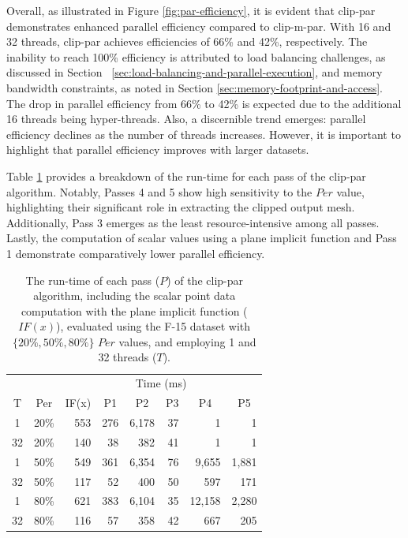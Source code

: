 \documentclass{egpubl}
\begin{document}
Overall, as illustrated in Figure \ref{fig:par-efficiency}, it is evident that clip-par demonstrates enhanced parallel efficiency compared to clip-m-par. With 16 and 32 threads, clip-par achieves efficiencies of 66\% and 42\%, respectively. The inability to reach 100\% efficiency is attributed to load balancing challenges, as discussed in Section ~\ref{sec:load-balancing-and-parallel-execution}, and memory bandwidth constraints, as noted in Section \ref{sec:memory-footprint-and-access}. The drop in parallel efficiency from 66\% to 42\% is expected due to the additional 16 threads being hyper-threads. Also, a discernible trend emerges: parallel efficiency declines as the number of threads increases. However, it is important to highlight that parallel efficiency improves with larger datasets.

Table \ref{tab:pass-time} provides a breakdown of the run-time for each pass of the clip-par algorithm. Notably, Passes 4 and 5 show high sensitivity to the $Per$ value, highlighting their significant role in extracting the clipped output mesh. Additionally, Pass 3 emerges as the least resource-intensive among all passes. Lastly, the computation of scalar values using a plane implicit function and Pass 1 demonstrate comparatively lower parallel efficiency. 

\begin{table}[h]
\centering
\caption{The run-time of each pass ($P$) of the clip-par algorithm, including the scalar point data computation with the plane implicit function ($IF(x)$),  evaluated using the F-15 dataset with  $\{20\%, 50\%, 80\%\}$ $Per$ values, and employing 1 and 32 threads ($T$).}
\label{tab:pass-time}
\begin{tabular}{cc@{\quad}rrrrrr}
\toprule
\multicolumn{2}{l}{} & \multicolumn{6}{c}{Time (ms)}                                                                                                                                        \\
T  & Per & \multicolumn{1}{c}{IF(x)} & \multicolumn{1}{c}{P1} & \multicolumn{1}{c}{P2} & \multicolumn{1}{c}{P3} & \multicolumn{1}{c}{P4} & \multicolumn{1}{c}{P5} \\
\midrule
1  & 20\% & 553   & 276 & 6,178 & 37 & 1      & 1     \\
32 & 20\% & 140   & 38  & 382   & 41 & 1      & 1     \\
1  & 50\% & 549   & 361 & 6,354 & 76 & 9,655  & 1,881 \\
32 & 50\% & 117   & 52  & 400   & 50 & 597    & 171   \\
1  & 80\% & 621   & 383 & 6,104 & 35 & 12,158 & 2,280 \\
32 & 80\% & 116   & 57  & 358   & 42 & 667    & 205   \\
\bottomrule
\end{tabular}
\end{table}
\end{document}
